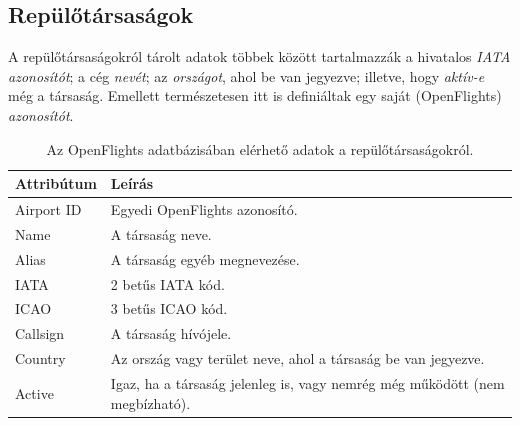     \subsection{Repülőtársaságok}
    A repülőtársaságokról tárolt adatok többek között tartalmazzák a hivatalos \textit{IATA azonosítót}; a cég \textit{nevét}; az \textit{országot}, ahol be van jegyezve; illetve, hogy \textit{aktív-e} még a társaság. Emellett természetesen itt is definiáltak egy saját (OpenFlights) \textit{azonosítót}.

    \begin{table}[ht]
      \footnotesize
      \centering
      \caption{Az OpenFlights adatbázisában elérhető adatok a repülőtársaságokról.}
      \begin{tabular}{ | l | l |}
      \hline
      Attribútum & Leírás \\ \hline
      Airport ID & Egyedi OpenFlights azonosító.\\
      Name & A társaság neve.\\
      Alias & A társaság egyéb megnevezése.\\
      IATA & 2 betűs IATA kód.\\
      ICAO & 3 betűs ICAO kód.\\
      Callsign & A társaság hívójele.\\
      Country & Az ország vagy terület neve, ahol a társaság be van jegyezve.\\
      Active & Igaz, ha a társaság jelenleg is, vagy nemrég még működött (nem megbízható).\\
      \hline
      \end{tabular}
      \label{tab:table_repulesitarsasagok}
    \end{table}

